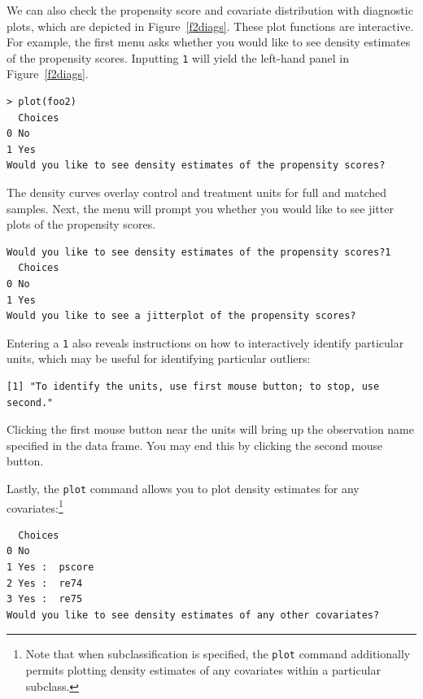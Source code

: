\documentclass[oneside,letterpaper,titlepage]{article}
\begin{document}
We can also check the propensity score and covariate distribution with
diagnostic plots, which are depicted in Figure~\ref{f2diags}.  These
plot functions are interactive.  For example, the first menu asks
whether you would like to see density estimates of the propensity
scores.  Inputting \texttt{1} will yield the left-hand panel in
Figure~\ref{f2diags}.

\begin{verbatim}
> plot(foo2)
  Choices
0 No     
1 Yes    
Would you like to see density estimates of the propensity scores?
\end{verbatim}

The density curves overlay control and treatment units for full and
matched samples.  Next, the menu will prompt you whether you would
like to see jitter plots of the propensity scores.

\begin{verbatim}
Would you like to see density estimates of the propensity scores?1
  Choices
0 No     
1 Yes    
Would you like to see a jitterplot of the propensity scores?
\end{verbatim}

Entering a \texttt{1} also reveals instructions on how to
interactively identify particular units, which may be useful for
identifying particular outliers:

\begin{verbatim}
[1] "To identify the units, use first mouse button; to stop, use
second."
\end{verbatim}

Clicking the first mouse button near the units will bring up the
observation name specified in the data frame.  You may end this by
clicking the second mouse button.

Lastly, the \texttt{plot} command allows you to plot density estimates
for any covariates:\footnote{Note that when
  subclassification is specified, the \texttt{plot} command
  additionally permits plotting density estimates of any covariates
  within a particular subclass.}

\begin{verbatim}
  Choices         
0 No              
1 Yes :  pscore   
2 Yes :  re74     
3 Yes :  re75     
Would you like to see density estimates of any other covariates?
\end{verbatim}
\end{document}
